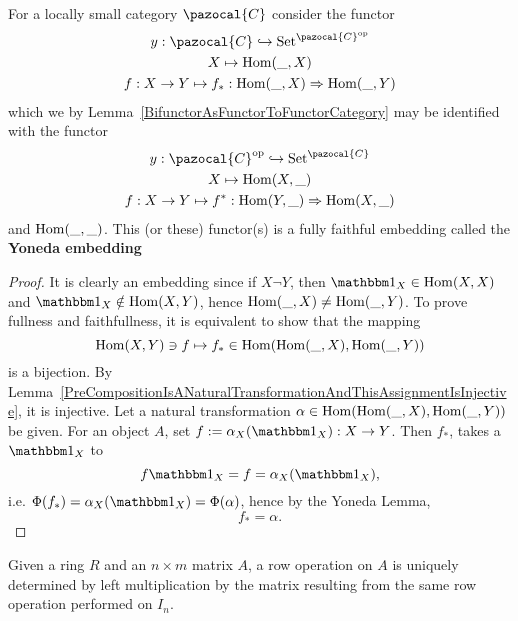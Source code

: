 \begin{corollary}\label{YonedaEmbedding}
    For a locally small category $\pazocal{C}$ consider the functor
    \begin{gather*}
        y: \pazocal{C} \hookrightarrow \mathrm{Set}^{\pazocal{C}\op}\\
        X \mapsto \Hom(\_,X)\\
        f : X\rightarrow Y \mapsto f_\ast : \Hom(\_,X)\Rightarrow \Hom(\_,Y)
    \end{gather*}
    which we by Lemma~\ref{BifunctorAsFunctorToFunctorCategory} may be identified with the functor 
    \begin{gather*}
        y: \pazocal{C}\op \hookrightarrow \mathrm{Set}^{\pazocal{C}}\\
        X \mapsto \Hom(X,\_)\\
        f : X\rightarrow Y \mapsto f^\ast : \Hom(Y,\_)\Rightarrow \Hom(X,\_)
    \end{gather*}
    and $\mathrm{Hom}(\_,\_)$. This (or these) functor(s) is a fully faithful embedding called the \textbf{Yoneda embedding}
\end{corollary}
\begin{proof}
    It is clearly an embedding since if $X\neg Y$, then $\fone_X\in \Hom(X,X)$ and $\fone_X\notin \Hom(X,Y)$, hence $\mathrm{Hom}(\_,X)\neq \mathrm{Hom}(\_,Y)$. To prove fullness and faithfullness, it is equivalent to show that the mapping 
    $$
        \mathrm{Hom}(X,Y)\ni f \mapsto f_\ast\in \mathrm{Hom}(\mathrm{Hom}(\_,X),\mathrm{Hom}(\_,Y))
    $$
    is a bijection. By Lemma~\ref{PreCompositionIsANaturalTransformationAndThisAssignmentIsInjective}, it is injective. Let a natural transformation $\alpha\in \mathrm{Hom}(\mathrm{Hom}(\_,X),\mathrm{Hom}(\_,Y))$ be given. For an object $A$, set $f:= \alpha_X(\fone_X) : X \rightarrow Y$. Then $f_\ast$, takes a $\fone_X$ to 
    $$f\fone_X = f = \alpha_X(\fone_X),$$
    i.e. $\Phi(f_\ast)=\alpha_X(\fone_X)=\Phi(\alpha)$, hence by the Yoneda Lemma, 
    $$f_\ast = \alpha.$$

\end{proof}
\begin{corollary}
    Given a ring $R$ and an $n\times m$ matrix $A$, a row operation on $A$ is uniquely determined by left multiplication by the matrix resulting from the same row operation performed on $I_n$. 
\end{corollary}
